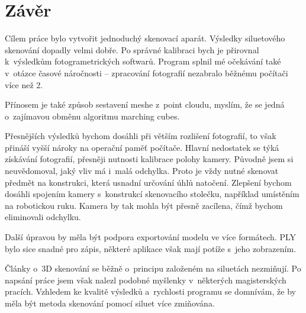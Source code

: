 \documentclass[12pt]{report}			%
\begin{document}
	    \chapter*{Závěr}

    		Cílem práce bylo vytvořit jednoduchý skenovací aparát. Výsledky siluetového skenování dopadly velmi dobře. Po správné kalibraci bych je přirovnal k~výsledkům fotogrametrických softwarů. Program splnil mé očekávání také v~otázce časové náročnosti -- zpracování fotografií nezabralo běžnému počítači více než \SI{2}{\min}.
    
    		Přínosem je také způsob sestavení meshe z~point cloudu, myslím, že se jedná o~zajímavou obměnu algoritmu marching cubes.
    
    		Přesnějších výsledků bychom dosáhli při větším rozlišení fotografií, to však přináší vyšší nároky na operační paměť počítače. Hlavní nedostatek se týká získávání fotografií, přesněji nutnosti kalibrace polohy kamery. Původně jsem si neuvědomoval, jaký vliv má i~malá odchylka. Proto je vždy nutné skenovat předmět na konstrukci, která usnadní určování úhlů natočení. Zlepšení bychom dosáhli spojením kamery s~konstrukcí skenovacího stolečku, například umístěním na robotickou ruku. Kamera by tak mohla být přesně zacílena, čímž bychom eliminovali odchylku.
    
    		Další úpravou by měla být podpora exportování modelu ve více formátech. PLY bylo sice snadné pro zápis, některé aplikace však mají potíže s~jeho zobrazením.
    
    		Články o~3D skenování se běžně o~principu založeném na siluetách nezmiňují. Po napsání práce jsem však nalezl podobné myšlenky v~některých magisterských pracích. Vzhledem ke kvalitě výsledků a~rychlosti programu se domnívám, že by měla být metoda skenování pomocí siluet více zmiňována.

	\nocite{*}
    \printbibliography					%
    \listoffigures						%
\end{document}
